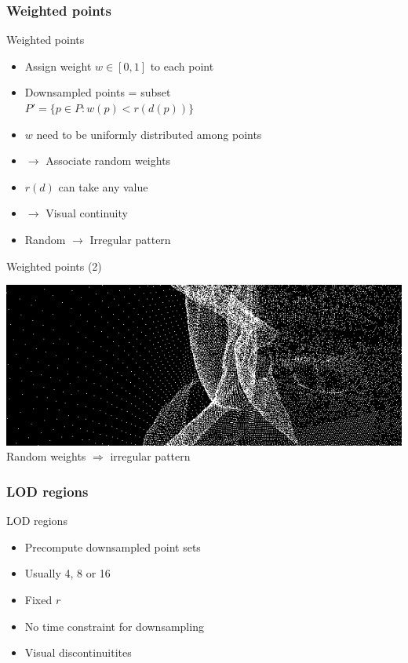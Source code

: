 \documentclass{beamer}
\begin{document}
\subsubsection{Weighted points}

\begin{frame}{Weighted points}
	\begin{itemize}
	\item Assign weight $w \in [0,1]$ to each point
	\item Downsampled points = subset \\
	$P' = \{ p \in P : w(p) < r(d(p)) \}$
	\item $w$ need to be uniformly distributed among points
	\item $\rightarrow$ Associate random weights 
	\item $r(d)$ can take any value
	\item $\rightarrow$ Visual continuity
	\item Random $\rightarrow$ Irregular pattern
	\end{itemize}
\end{frame}

\begin{frame}{Weighted points (2)}
	\begin{center}
	\includegraphics[width=.9\textwidth]{random_weights.png} \\
	Random weights $\Rightarrow$ irregular pattern
	\end{center}
\end{frame}

\subsubsection{LOD regions}

\begin{frame}{LOD regions}
	\begin{itemize}
	\item Precompute downsampled point sets
	\item Usually 4, 8 or 16
	\item Fixed $r$
	\item No time constraint for downsampling
	\item Visual discontinuitites
	\end{itemize}
\end{frame}
\end{document}
